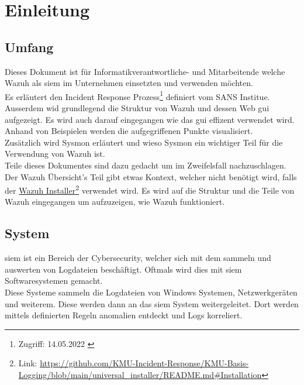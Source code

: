 \chapter{Einleitung}

\section{Umfang}
Dieses Dokument ist für Informatikverantwortliche- und Mitarbeitende welche Wazuh als \acrshort{siem} im Unternehmen einsetzten und verwenden möchten.\\

Es erläutert den Incident Response Prozess\footnote{Zugriff: 14.05.2022 \cite{sans-incident-handler-handbook}} definiert vom SANS Institue. 
Ausserdem wid grundlegend die Struktur von Wazuh und dessen Web \acrshort{gui} aufgezeigt.
Es wird auch darauf eingegangen wie das \acrshort{gui} effizent verwendet wird.
Anhand von Beispielen werden die aufgegriffenen Punkte visualisiert.\\

Zusätzlich wird Sysmon erläutert und wieso Sysmon ein wichtiger Teil für die Verwendung von Wazuh ist.\\

Teile dieses Dokumentes sind dazu gedacht um im Zweifelsfall nachzuschlagen.
Der Wazuh Übersicht's Teil gibt etwas Kontext, welcher nicht benötigt wird, falls der \href{https://github.com/KMU-Incident-Response/KMU-Basis-Logging/blob/main/universal\_installer/README.md\#Installation}{Wazuh Installer}\footnote{Link: \href{https://github.com/KMU-Incident-Response/KMU-Basis-Logging/blob/main/universal\_installer/README.md\#Installation}{https://github.com/KMU-Incident-Response/KMU-Basis-Logging/blob/main/universal\_installer/README.md\#Installation}} verwendet wird.
Es wird auf die Struktur und die Teile von Wazuh eingegangen um aufzuzeigen, wie Wazuh funktioniert.  


\section{ System}
\acrfull{siem} ist ein Bereich der Cybersecurity, welcher sich mit dem sammeln und auswerten von Logdateien beschäftigt.
Oftmals wird dies mit \acrshort{siem} Softwaresystemen gemacht.\\

Diese Systeme sammeln die Logdateien von Windows Systemen, Netzwerkgeräten und weiterem.
Diese werden dann an das \acrshort{siem} System weitergeleitet.
Dort werden mittels definierten Regeln anomalien entdeckt und Logs korreliert.

